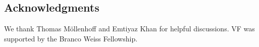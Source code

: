 \documentclass{article}
\theoremstyle{plain}
\theoremstyle{definition}
\theoremstyle{remark}
\theoremstyle{plain}
\begin{document}
\subsection*{Acknowledgments}

We thank Thomas M\"{o}llenhoff and Emtiyaz Khan for helpful discussions.
VF was supported by the Branco Weiss Fellowship.













\appendix
\onecolumn
\end{document}
